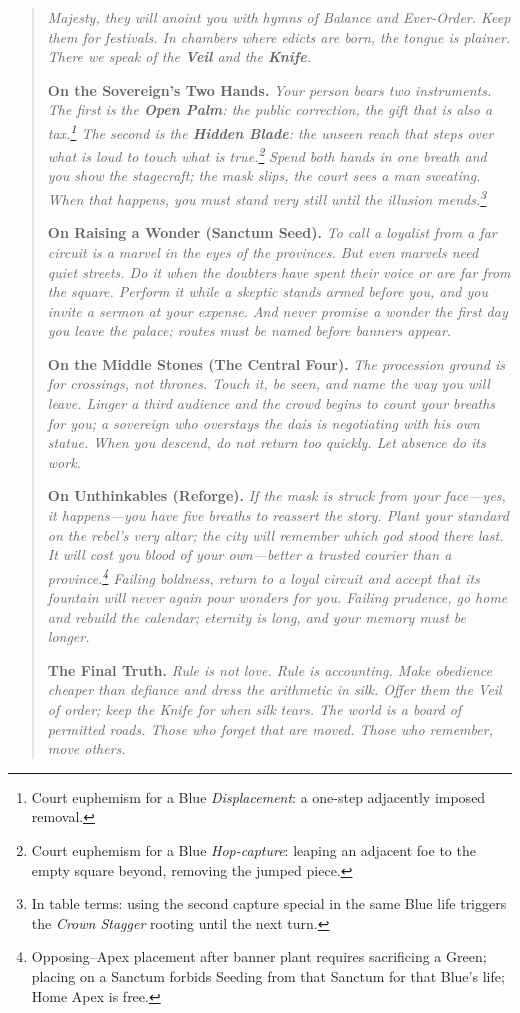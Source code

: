 \documentclass[11pt]{article}
\begin{document}
\begin{quote}\small
\emph{Majesty, they will anoint you with hymns of Balance and Ever-Order. Keep them for festivals. In chambers where edicts are born, the tongue is plainer. There we speak of the \textbf{Veil} and the \textbf{Knife}.}

\medskip
\textbf{On the Sovereign’s Two Hands.} \emph{Your person bears two instruments. The first is the \textbf{Open Palm}: the public correction, the gift that is also a tax.\footnote{Court euphemism for a Blue \emph{Displacement}: a one-step adjacently imposed removal.} The second is the \textbf{Hidden Blade}: the unseen reach that steps over what is loud to touch what is true.\footnote{Court euphemism for a Blue \emph{Hop-capture}: leaping an adjacent foe to the empty square beyond, removing the jumped piece.}} \emph{Spend both hands in one breath and you show the stagecraft; the mask slips, the court sees a man sweating. When that happens, you must stand very still until the illusion mends.\footnote{In table terms: using the second capture special in the same Blue life triggers the \emph{Crown Stagger} rooting until the next turn.}}

\medskip
\textbf{On Raising a Wonder (Sanctum Seed).} \emph{To call a loyalist from a far circuit is a marvel in the eyes of the provinces. But even marvels need quiet streets. Do it when the doubters have spent their voice or are far from the square. Perform it while a skeptic stands armed before you, and you invite a sermon at your expense. And never promise a wonder the first day you leave the palace; routes must be named before banners appear.}

\medskip
\textbf{On the Middle Stones (The Central Four).} \emph{The procession ground is for crossings, not thrones. Touch it, be seen, and name the way you will leave. Linger a third audience and the crowd begins to count your breaths for you; a sovereign who overstays the dais is negotiating with his own statue. When you descend, do not return too quickly. Let absence do its work.}

\medskip
\textbf{On Unthinkables (Reforge).} \emph{If the mask is struck from your face—yes, it happens—you have five breaths to reassert the story. Plant your standard on the rebel’s very altar; the city will remember which god stood there last. It will cost you blood of your own—better a trusted courier than a province.\footnote{Opposing–Apex placement after banner plant requires sacrificing a Green; placing on a Sanctum forbids Seeding from that Sanctum for that Blue’s life; Home Apex is free.} Failing boldness, return to a loyal circuit and accept that its fountain will never again pour wonders for you. Failing prudence, go home and rebuild the calendar; eternity is long, and your memory must be longer.}

\medskip
\textbf{The Final Truth.} \emph{Rule is not love. Rule is accounting. Make obedience cheaper than defiance and dress the arithmetic in silk. Offer them the Veil of order; keep the Knife for when silk tears. The world is a board of permitted roads. Those who forget that are moved. Those who remember, move others.}
\end{quote}
\end{document}
